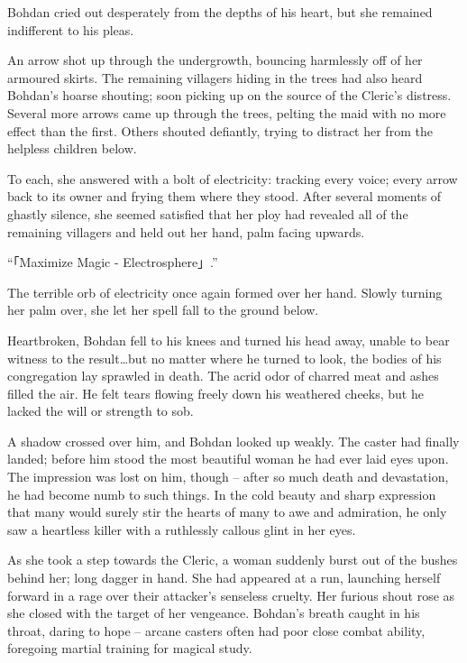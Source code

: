  

Bohdan cried out desperately from the depths of his heart, but she remained indifferent to his pleas.

 

An arrow shot up through the undergrowth, bouncing harmlessly off of her armoured skirts. The remaining villagers hiding in the trees had also heard Bohdan’s hoarse shouting; soon picking up on the source of the Cleric’s distress. Several more arrows came up through the trees, pelting the maid with no more effect than the first. Others shouted defiantly, trying to distract her from the helpless children below.

 

To each, she answered with a bolt of electricity: tracking every voice; every arrow back to its owner and frying them where they stood. After several moments of ghastly silence, she seemed satisfied that her ploy had revealed all of the remaining villagers and held out her hand, palm facing upwards.

 

“「Maximize Magic - Electrosphere」.”

 

The terrible orb of electricity once again formed over her hand. Slowly turning her palm over, she let her spell fall to the ground below.

 

Heartbroken, Bohdan fell to his knees and turned his head away, unable to bear witness to the result…but no matter where he turned to look, the bodies of his congregation lay sprawled in death. The acrid odor of charred meat and ashes filled the air. He felt tears flowing freely down his weathered cheeks, but he lacked the will or strength to sob.

 

A shadow crossed over him, and Bohdan looked up weakly. The caster had finally landed; before him stood the most beautiful woman he had ever laid eyes upon. The impression was lost on him, though – after so much death and devastation, he had become numb to such things. In the cold beauty and sharp expression that many would surely stir the hearts of many to awe and admiration, he only saw a heartless killer with a ruthlessly callous glint in her eyes.

 

As she took a step towards the Cleric, a woman suddenly burst out of the bushes behind her; long dagger in hand. She had appeared at a run, launching herself forward in a rage over their attacker’s senseless cruelty. Her furious shout rose as she closed with the target of her vengeance. Bohdan’s breath caught in his throat, daring to hope – arcane casters often had poor close combat ability, foregoing martial training for magical study.

